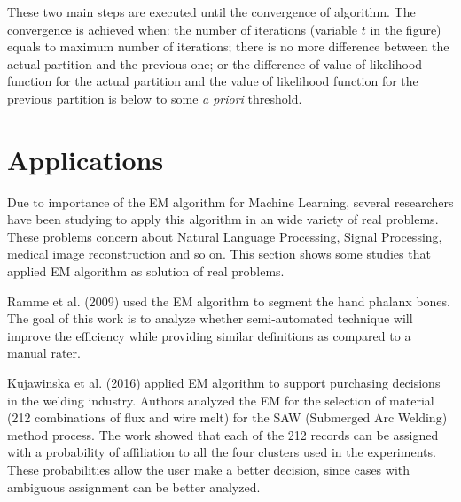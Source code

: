 These two main steps are executed until the convergence of algorithm. The convergence is achieved when: the number of iterations (variable $t$ in the figure) equals to maximum number of iterations; there is no more difference between the actual partition and the previous one; or the difference of value of likelihood function for the actual partition and the value of likelihood function for the previous partition is below to some \textit{a priori} threshold.

\section{Applications}
\label{sec:applications}

Due to importance of the EM algorithm for Machine Learning, several researchers have been studying to apply this algorithm in an wide variety of real problems. These problems concern about Natural Language Processing, Signal Processing, medical image reconstruction and so on. This section shows some studies that applied EM algorithm as solution of real problems.

Ramme et al. (2009) \cite{ramme2009semi} used the EM algorithm to segment the hand phalanx bones. The goal of this work is to  analyze whether semi-automated technique will improve the efficiency while providing similar definitions as compared to a manual rater. %


Kujawinska et al. (2016) \cite{kujawinska2016} applied EM algorithm to support purchasing decisions in the welding industry. Authors analyzed the EM for the selection of material (212 combinations of flux and wire melt) for the SAW (Submerged Arc Welding) method process. The work showed that each of the
212 records can be assigned with a probability of affiliation to all the four clusters used in the experiments. These probabilities allow the user make a better decision, since cases with ambiguous assignment can be better analyzed.

